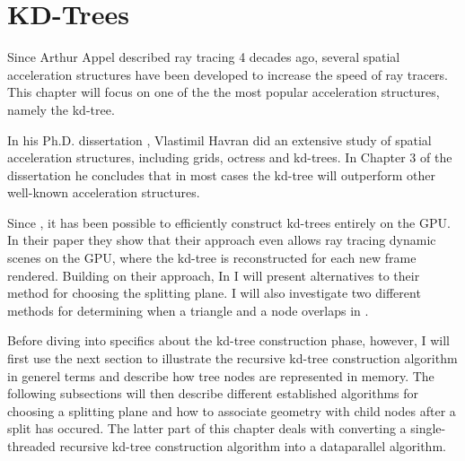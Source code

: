 \chapter{KD-Trees}\label{chp:kdTrees}






Since Arthur Appel described ray tracing 4 decades ago, several
spatial acceleration structures have been developed to increase the
speed of ray tracers. This chapter will focus on one of the the most
popular acceleration structures, namely the kd-tree.


In his Ph.D. dissertation , Vlastimil Havran did
an extensive study of spatial acceleration structures, including
grids, octress and kd-trees. In Chapter 3 of the dissertation he
concludes that in most cases the kd-tree will outperform other
well-known acceleration structures.


Since \zhou{}, it has been possible to efficiently construct kd-trees
entirely on the GPU. In their paper they show that their approach even
allows ray tracing dynamic scenes on the GPU, where the kd-tree is
reconstructed for each new frame rendered. Building on their approach,
In  I will present alternatives to their
method for choosing the splitting plane. I will also investigate two
different methods for determining when a triangle and a node overlaps
in .



Before diving into specifics about the kd-tree construction phase,
however, I will first use the next section to illustrate the recursive
kd-tree construction algorithm in generel terms and describe how tree
nodes are represented in memory. The following subsections will then
describe different established algorithms for choosing a splitting
plane and how to associate geometry with child nodes after a split has
occured. The latter part of this chapter deals with converting a
single-threaded recursive kd-tree construction algorithm into a
dataparallel algorithm.



